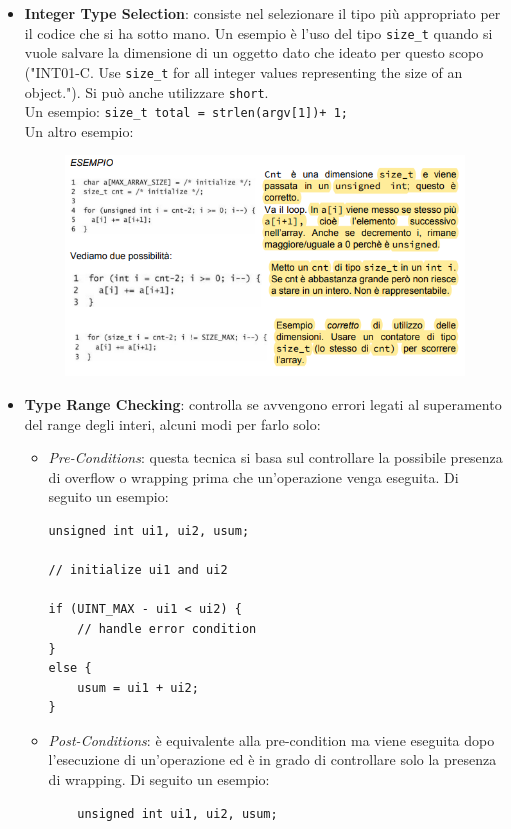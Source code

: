 \begin{itemize}
    \item \textbf{Integer Type Selection}:
          consiste nel selezionare il tipo più
          appropriato per il codice che si ha sotto mano.
          Un esempio è l'uso del tipo \verb|size_t| quando si vuole salvare la
          dimensione di un oggetto dato che ideato per questo scopo
          ("INT01-C. Use \verb|size_t| for all integer values representing the size of
          an object.").
          Si può anche utilizzare \verb|short|.\\
          Un esempio: \verb|size_t total = strlen(argv[1])+ 1;|\\
          Un altro esempio:
          \begin{figure}[H]
              \centering
              \includegraphics[width=12cm, keepaspectratio]{capitoli/secure_coding/img/cap_2/esempio_sizet.png}
          \end{figure}

    \item \textbf{Type Range Checking}:
          controlla se avvengono errori legati al superamento del range degli interi,
          alcuni modi per farlo solo: \begin{itemize}
              \item \textit{Pre-Conditions}:
                    questa tecnica si basa sul controllare la possibile presenza di
                    overflow o wrapping prima che un'operazione venga eseguita.
                    Di seguito un esempio:
                    \begin{lstlisting}
unsigned int ui1, ui2, usum;

// initialize ui1 and ui2

if (UINT_MAX - ui1 < ui2) {
    // handle error condition
}
else {
    usum = ui1 + ui2;
}
                    \end{lstlisting}
              \item \textit{Post-Conditions}:
                    è equivalente alla pre-condition ma viene eseguita dopo
                    l'esecuzione di un'operazione ed è in grado di controllare solo la
                    presenza di wrapping. Di seguito un esempio:
                    \begin{lstlisting}
    unsigned int ui1, ui2, usum;


\end{lstlisting}
\end{itemize}
\end{itemize}
